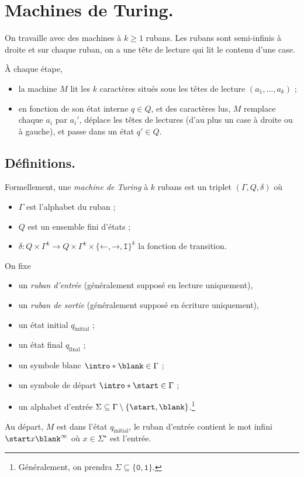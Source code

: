 \documentclass[./main]{subfiles}
\begin{document}
  \chapter{Machines de Turing.}
  
  On travaille avec des machines à $k \ge 1$ rubans. Les rubans sont semi-infinis à droite et sur chaque ruban, on a une tête de lecture qui lit le contenu d'une case.

  À chaque étape,
  \begin{itemize}
    \item la machine $M$ lit les $k$ caractères situés sous les têtes de lecture $(a_1, \ldots, a_k)$ ;
    \item en fonction de son état interne $q \in Q$, et des caractères lus, $M$ remplace chaque $a_i$ par $a_i'$, déplace les têtes de lectures (d'au plus un case à droite ou à gauche), et passe dans un état $q' \in Q$.
  \end{itemize}

  \section{Définitions.}

  \begin{defn}
    Formellement, une \textit{machine de Turing} à $k$ rubans est un triplet $(\Gamma, Q, \delta)$ où
    \begin{itemize}
      \item $\Gamma$ est l'alphabet du ruban ;
      \item $Q$ est un ensemble fini d'états ;
      \item $\delta : Q \times \Gamma^k \to Q \times \Gamma^k \times \{\texttt{←}, \texttt{→}, \texttt{I}\}^k$ la fonction de transition.
    \end{itemize}
  \end{defn}

  \begin{rmk}
    On fixe 
    \begin{itemize}
      \item un \textit{ruban d'entrée} (généralement supposé en lecture uniquement), 
      \item un \textit{ruban de sortie} (généralement supposé en écriture uniquement),
      \item un état initial $q_\text{initial}$ ;
      \item un état final $q_\text{final}$ ;
      \item un symbole blanc $\intro * \blank \in \Gamma$ ;
      \item un symbole de départ $\intro * \start \in \Gamma$ ;
      \item un alphabet d'entrée $\Sigma \subseteq \Gamma \setminus \{\start, \blank\}$.\footnote{Généralement, on prendra $\Sigma \subseteq \{\texttt{0},\texttt{1}\}$.}
    \end{itemize}

    Au départ, $M$ est dans l'état $q_\text{initial}$, le ruban d'entrée contient le mot infini $\start x \blank^\infty$ où $x \in \Sigma^\star$ est l'entrée.
  \end{rmk}
\end{document}
